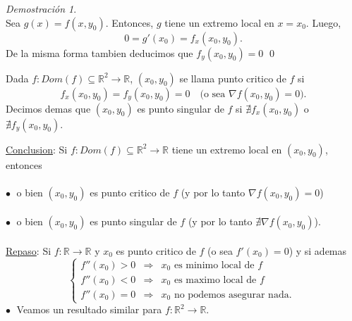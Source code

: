 \documentclass{article}
\theoremstyle{definition}
\theoremstyle{remark}
\newtheorem*{demo}{Demostración}
\newcommand\bl{$\bullet\;$}
\begin{document}
\begin{demo} \;\\
  Sea $g(x)=f(x,y_0)$. Entonces, $g$ tiene un extremo local en $x=x_0$. Luego, \[
    0=g'(x_0)=f_x(x_0,y_0).
  \]
  De la misma forma tambien deducimos que $f_y(x_0,y_0)=0$
  \qed
\end{demo} \pagebreak
\begin{defi}
  Dada $f : Dom(f) \subseteq \mathbb{R}^2 \to \mathbb{R}$, $(x_0,y_0)$ se llama punto critico de $f$ si $$f_x(x_0,y_0)=f_y(x_0,y_0)=0 \quad \big(\text{o sea }\nabla f(x_0,y_0)=0\big).$$ Decimos demas que $(x_0,y_0)$ es punto singular de $f$ si $\nexists f_x(x_0,y_0)$ o $ \nexists f_y(x_0,y_0)$.
\end{defi}
\underline{Conclusion}: Si $f: Dom(f) \subseteq \mathbb{R}^2 \to \mathbb{R}$ tiene un extremo local en $(x_0,y_0)$, entonces \\\\ \textcolor{rojop2}{\bl} o bien $(x_0,y_0)$ es punto critico de $f$ \big(y por lo tanto $\nabla f(x_0,y_0)=0$\big) \\\\
\textcolor{rojop2}{\bl} o bien $(x_0,y_0)$ es punto singular de $f$ \big(y por lo tanto $\nexists \nabla f(x_0,y_0)$\big).
\\\\
\underline{Repaso}: Si $f : \mathbb{R} \to \mathbb{R}$ y $x_0$ es punto critico de $f$ \big(o sea $f'(x_0)=0$\big) y si ademas $$\left\{
\begin{array}{lcl} 
  f''(x_0)>0 & \Rightarrow & x_0 \text{ es minimo local de } f \\
  f''(x_0)<0 & \Rightarrow & x_0 \text{ es maximo local de } f \\
  f''(x_0)=0 & \Rightarrow & x_0 \text{ no podemos asegurar nada. } 
\end{array}\right.$$
\textcolor{rojop2}{\bl} Veamos un resultado similar para $f : \mathbb{R}^2 \to \mathbb{R}$.
\end{document}
